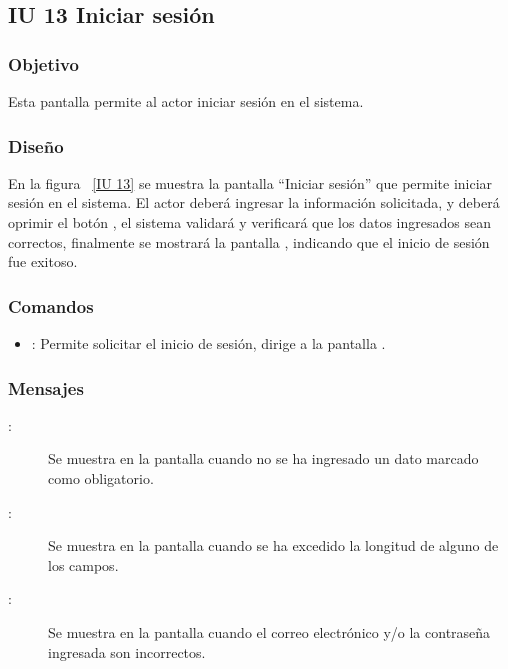 \newpage 
\subsection{IU 13 Iniciar sesión}

\subsubsection{Objetivo}
	
	Esta pantalla permite al actor iniciar sesión en el sistema.

\subsubsection{Diseño}

    En la figura ~\ref{IU 13} se muestra la pantalla ``Iniciar sesión'' que permite iniciar sesión en el sistema. El actor deberá ingresar la información solicitada, y deberá oprimir el botón , el sistema validará y verificará que los datos ingresados sean correctos, finalmente se mostrará la pantalla , indicando que el inicio de sesión fue exitoso.


   

\subsubsection{Comandos}
\begin{itemize}
	\item {}: Permite solicitar el inicio de sesión, dirige a la pantalla .
\end{itemize}

\subsubsection{Mensajes}

	
\begin{description}
	\item[:] Se muestra en la pantalla  cuando no se ha ingresado un dato marcado como obligatorio.
	\item[:] Se muestra en la pantalla  cuando se ha excedido la longitud de alguno de los campos.
	\item[:] Se muestra en la pantalla  cuando el correo electrónico y/o la contraseña ingresada son incorrectos.
\end{description}
